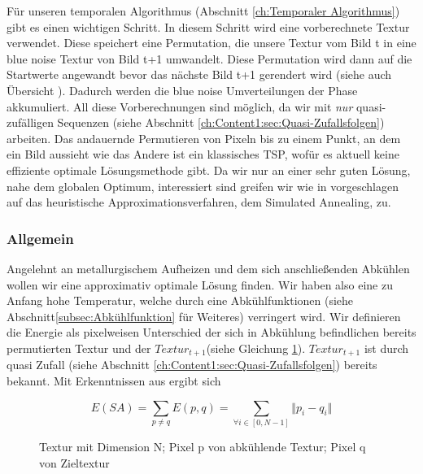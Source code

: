 Für unseren temporalen Algorithmus (Abschnitt \ref{ch:Temporaler Algorithmus}) gibt es einen 
wichtigen  Schritt.
In diesem Schritt wird eine vorberechnete Textur verwendet. Diese speichert eine
Permutation, die unsere  Textur vom Bild t in eine
blue noise Textur von Bild t+1 umwandelt. Diese Permutation wird 
dann auf die Startwerte angewandt bevor das nächste Bild t+1 gerendert wird (siehe auch Übersicht ).
Dadurch werden die blue noise Umverteilungen der  Phase akkumuliert. 
All diese Vorberechnungen sind möglich, da wir mit \textit{\glqq nur\grqq} quasi-zufälligen Sequenzen 
(siehe Abschnitt \ref{ch:Content1:sec:Quasi-Zufallsfolgen}) arbeiten.
Das andauernde Permutieren von Pixeln bis zu einem Punkt, an dem ein Bild aussieht wie das Andere ist 
ein klassisches TSP, wofür es aktuell keine effiziente optimale Lösungsmethode gibt.
Da wir nur an einer sehr guten Lösung, nahe dem globalen Optimum, interessiert sind 
greifen wir wie in \cite{hal02158423} vorgeschlagen auf das heuristische Approximationsverfahren,
dem Simulated Annealing, zu.

\subsubsection{Allgemein}

Angelehnt an metallurgischem Aufheizen und dem sich anschließenden Abkühlen wollen wir eine approximativ
optimale Lösung finden. Wir haben also eine zu Anfang hohe Temperatur, welche durch eine Abkühlfunktionen
(siehe Abschnitt\ref{subsec:Abkühlfunktion} für Weiteres) verringert wird.
Wir definieren die Energie als pixelweisen Unterschied der sich in Abkühlung 
befindlichen bereits permutierten Textur und der $Textur_{t+1}$(siehe Gleichung \ref{eq:pixel energy function}). 
$Textur_{t+1}$ ist durch quasi Zufall (siehe Abschnitt \ref{ch:Content1:sec:Quasi-Zufallsfolgen}) bereits bekannt.
Mit Erkenntnissen aus\cite{georgiev2016blue} ergibt sich

\begin{figure}[H]
  \[ E(SA) = \sum_{p \neq q}E(p,q) = \sum_{\forall i \in [0,N-1]} \Vert{p_{i}-q_{i}}\Vert \]
  \caption{ Textur mit Dimension N; Pixel p von abkühlende 
  Textur; Pixel q von Zieltextur}
  \label{eq:pixel energy function}
\end{figure}

